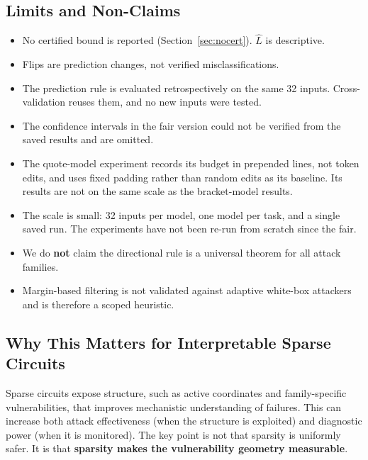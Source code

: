 \documentclass[11pt]{article}
\newcommand{\Lhat}{\hat{L}}
\begin{document}
\subsection{Limits and Non-Claims}
\begin{itemize}
  \item No certified bound is reported (Section~\ref{sec:nocert}). $\Lhat$ is descriptive.
  \item Flips are prediction changes, not verified misclassifications.
  \item The prediction rule is evaluated retrospectively on the same 32 inputs. Cross-validation reuses them, and no new inputs were tested.
  \item The confidence intervals in the fair version could not be verified from the saved results and are omitted.
  \item The quote-model experiment records its budget in prepended lines, not token edits, and uses fixed padding rather than random edits as its baseline. Its results are not on the same scale as the bracket-model results.
  \item The scale is small: 32 inputs per model, one model per task, and a single saved run. The experiments have not been re-run from scratch since the fair.
  \item We do \textbf{not} claim the directional rule is a universal theorem for all attack families.
  \item Margin-based filtering is not validated against adaptive white-box attackers and is therefore a scoped heuristic.
\end{itemize}

\subsection{Why This Matters for Interpretable Sparse Circuits}
Sparse circuits expose structure, such as active coordinates and family-specific vulnerabilities, that improves mechanistic understanding of failures. This can increase both attack effectiveness (when the structure is exploited) and diagnostic power (when it is monitored). The key point is not that sparsity is uniformly safer. It is that \textbf{sparsity makes the vulnerability geometry measurable}.
\end{document}
